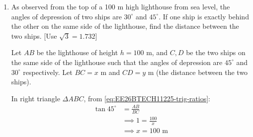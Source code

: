 \begin{enumerate}[label=\thesubsection.\arabic*, ref=\thesubsection.\theenumi]
\solution Given:
Upper radius $R = \frac{30}{2} = 15\text{ cm}$, lower radius $r = \frac{10}{2} = 5\text{ cm}$, height $h = 24\text{ cm}$. \\[4pt]
From \eqref{eq:EE26BTECH11225-frustum-l}, the slant height $l$ of the frustum is:
\begin{align}
    l &= \sqrt{h^2 + (R - r)^2} \\
    &= \sqrt{24^2 + (15 - 5)^2} \\
    &= \sqrt{576 + 10^2} = \sqrt{576 + 100} = \sqrt{676} = 26\text{ cm}
\end{align}
(i) From \eqref{eq:EE26BTECH11225-frustum-area}, area of the metal sheet used = Curved Surface Area + Area of bottom circular base:
\begin{align}
    \text{Area} &= \pi(R + r)l + \pi r^2 \\
    &= \pi \left[ (15 + 5) \times 26 + 5^2 \right] \\
    &= \pi (20 \times 26 + 25) \\
    &= \pi (520 + 25) = 545 \pi \\
    &= 545 \times 3.14 = 1711.3\text{ cm}^2
\end{align}
Thus, the area of the metal sheet used is $1711.3\text{ cm}^2$. \\[6pt]
(ii) Plastic buckets should be avoided because ordinary plastic is non-biodegradable and causes environmental pollution. Additionally, plastics may leach toxic chemicals when stored with hot water or food items.
    \item As observed from the top of a 100 m high lighthouse from sea level, the angles of depression of two ships are $30^\circ$ and $45^\circ$. If one ship is exactly behind the other on the same side of the lighthouse, find the distance between the two ships. [Use $\sqrt{3} = 1.732$]

\solution Let $AB$ be the lighthouse of height $h = 100\text{ m}$, and $C, D$ be the two ships on the same side of the lighthouse such that the angles of depression are $45^\circ$ and $30^\circ$ respectively. Let $BC = x\text{ m}$ and $CD = y\text{ m}$ (the distance between the two ships).

\begin{center}
    
    \label{fig:lighthouse_q29}
\end{center}

In right triangle $\Delta ABC$, from \eqref{eq:EE26BTECH11225-trig-ratios}:
\begin{align}
    \tan 45^\circ &= \frac{AB}{BC} \\
    &\implies 1 = \frac{100}{x} \\
    &\implies x = 100\text{ m}
\end{align}


\end{enumerate}
